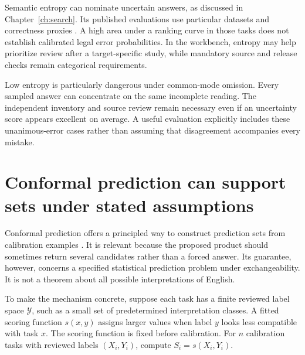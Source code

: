 Semantic entropy can nominate uncertain answers, as discussed in
Chapter~\ref{ch:search}. Its published evaluations use particular datasets and
correctness proxies \citep{semantic2023}. A high area under a ranking curve in
those tasks does not establish calibrated legal error probabilities. In the
workbench, entropy may help prioritize review after a target-specific study, while
mandatory source and release checks remain categorical requirements.

Low entropy is particularly dangerous under common-mode omission. Every sampled
answer can concentrate on the same incomplete reading. The independent inventory
and source review remain necessary even if an uncertainty score appears excellent
on average. A useful evaluation explicitly includes these unanimous-error cases
rather than assuming that disagreement accompanies every mistake.

\section{Conformal prediction can support sets under stated assumptions}
\label{merge:M09:09}


Conformal prediction offers a principled way to construct prediction sets from
calibration examples \citep[section 1.1 and appendix D]{conformal2022}. It is
relevant because the proposed product should sometimes return several candidates
rather than a forced answer. Its guarantee, however, concerns a specified
statistical prediction problem under exchangeability. It is not a theorem about
all possible interpretations of English.

To make the mechanism concrete, suppose each task has a finite reviewed label
space $\mathcal Y$, such as a small set of predetermined interpretation classes.
A fitted scoring function $s(x,y)$ assigns larger values when label $y$ looks less
compatible with task $x$. The scoring function is fixed before calibration.
For $n$ calibration tasks with reviewed labels $(X_i,Y_i)$, compute
$S_i=s(X_i,Y_i)$.

